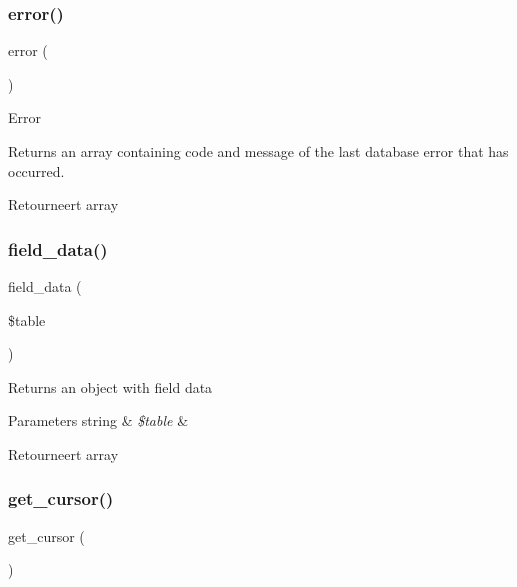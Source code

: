 \subsubsection{\texorpdfstring{error()}{error()}}
{\footnotesize\ttfamily error (\begin{DoxyParamCaption}{ }\end{DoxyParamCaption})}

Error

Returns an array containing code and message of the last database error that has occurred.

\begin{DoxyReturn}{Retourneert}
array 
\end{DoxyReturn}
\mbox{\label{class_c_i___d_b__oci8__driver_a90355121e1ed009e0efdbd544ab56efa}} 
\subsubsection{\texorpdfstring{field\_data()}{field\_data()}}
{\footnotesize\ttfamily field\+\_\+data (\begin{DoxyParamCaption}\item[{}]{\$table }\end{DoxyParamCaption})}

Returns an object with field data


\begin{DoxyParams}[1]{Parameters}
string & {\em \$table} & \\
\hline
\end{DoxyParams}
\begin{DoxyReturn}{Retourneert}
array 
\end{DoxyReturn}
\mbox{\label{class_c_i___d_b__oci8__driver_aaf8b241dc9ed2d812e965dc882ed9ea3}} 
\subsubsection{\texorpdfstring{get\_cursor()}{get\_cursor()}}
{\footnotesize\ttfamily get\+\_\+cursor (\begin{DoxyParamCaption}{ }\end{DoxyParamCaption})}

